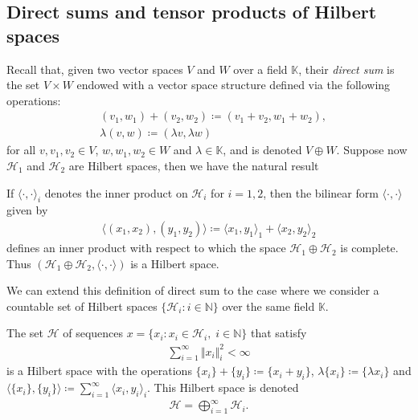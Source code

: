 \begin{appendices}
\section{Direct sums and tensor products of Hilbert spaces}
\label{appendix:direct-sum-tensor-product}

Recall that, given two vector spaces $V$ and $W$ over a field $\mathbb{K}$, their
\textit{direct sum} is the set $V\times W$ endowed with a vector space structure defined via
the following operations:
\begin{align*}
	&(v_1,w_1)+(v_2,w_2) \coloneq (v_1+v_2, w_1+w_2),\\
	&\lambda (v,w) \coloneq (\lambda v,\lambda w)
\end{align*}
for all $v,v_1,v_2\in V$, $w,w_1,w_2\in W$ and $\lambda\in\mathbb{K}$, and is denoted $V\oplus W$.
Suppose now $\mathcal{H}_1$ and $\mathcal{H}_2$ are Hilbert spaces, then we have the natural
result
\begin{proposition}
	If $\langle\cdot,\cdot\rangle_i$ denotes the inner product on $\mathcal{H}_i$ for $i=1,2$,
	then the bilinear form $\langle\cdot,\cdot\rangle$ given by
	\begin{align*}
		\langle (x_1,x_2),(y_1,y_2)\rangle \coloneq \langle x_1,y_1\rangle_1 + \langle x_2,y_2\rangle_2
	\end{align*}
	defines an inner product with respect to which the space $\mathcal{H}_1\oplus\mathcal{H}_2$
	is complete. Thus $(\mathcal{H}_1\oplus\mathcal{H}_2,\langle\cdot,\cdot\rangle)$ is a Hilbert
	space.
\end{proposition}

We can extend this definition of direct sum to the case where we consider a countable set of
Hilbert spaces $\{\mathcal{H}_i:i\in\mathbb{N}\}$ over the same field $\mathbb{K}$.
\begin{proposition}
	The set $\mathcal{H}$ of sequences $x=\{x_i:x_i\in\mathcal{H}_i,\;i\in\mathbb{N}\}$ that
	satisfy
	\begin{align*}
		\sum_{i=1}^\infty \Vert x_i\Vert^2_i < \infty
	\end{align*}
	is a Hilbert space with the operations $\{x_i\} + \{y_i\} \coloneq \{x_i + y_i\}$,
	$\lambda \{x_i\} \coloneq \{\lambda x_i\}$ and
	$\langle\{x_i\},\{y_i\}\rangle \coloneq \sum_{i=1}^\infty \langle x_i,y_i\rangle_i$.
	This Hilbert space is denoted
	\begin{align*}
		\mathcal{H} = \bigoplus_{i=1}^\infty \mathcal{H}_i.
	\end{align*}
\end{proposition}


\end{appendices}
